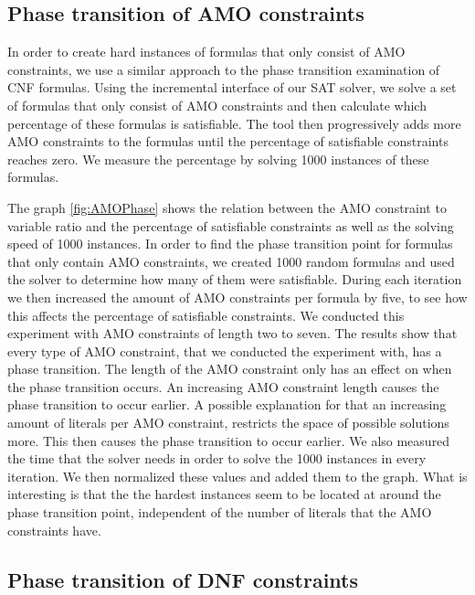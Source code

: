 \subsection{Phase transition of AMO constraints}

In order to create hard instances of formulas that only consist of AMO constraints, we use a similar approach to the phase transition examination of CNF formulas. Using the incremental interface of our SAT solver, we solve a set of formulas that only consist of AMO constraints and then calculate which percentage of these formulas is satisfiable. The tool then progressively adds more AMO constraints to the formulas until the percentage of satisfiable constraints reaches zero. We measure the percentage by solving 1000 instances of these formulas.



The graph \ref{fig:AMOPhase} shows the relation between the AMO constraint to variable ratio and the percentage of satisfiable constraints as well as the solving speed of 1000 instances. In order to find the phase transition point for formulas that only contain AMO constraints, we created 1000 random formulas and used the solver to determine how many of them were satisfiable. During each iteration we then increased the amount of AMO constraints per formula by five, to see how this affects the percentage of satisfiable constraints. We conducted this experiment with AMO constraints of length two to seven. The results show that every type of AMO constraint, that we conducted the experiment with, has a phase transition. The length of the AMO constraint only has an effect on when the phase transition occurs. An increasing AMO constraint length causes the phase transition to occur earlier. A possible explanation for that an increasing amount of literals per AMO constraint, restricts the space of possible solutions more. This then causes the phase transition to occur earlier. We also measured the time that the solver needs in order to solve the 1000 instances in every iteration. We then normalized these values and added them to the graph. What is interesting is that the the hardest instances seem to be located at around the phase transition point, independent of the number of literals that the AMO constraints have.

\subsection{Phase transition of DNF constraints}

